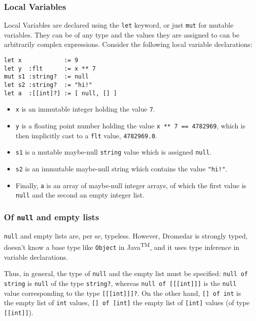\documentclass{article}
\newcommand{\code}[1]{\lstinline[columns=fixed]{#1}}
\begin{document}
			\subsubsection{Local Variables}
			
				Local Variables are declared using the \code{let} keyword, or just \code{mut} for mutable variables. They can be of any type and the values they are assigned to can be arbitrarily complex expressions. Consider the following local variable declarations:
				
				\begin{lstlisting}
let x            := 9
let y  :flt      := x ** 7
mut s1 :string?  := null
let s2 :string?  := "hi!"
let a  :[[int]?] := [ null, [] ]
				\end{lstlisting}
				
				\begin{itemize}
					\item
						\code{x} is an immutable integer holding the value \code{7}.
					\item
						\code{y} is a floating point number holding the value \code{x ** 7 == 4782969}, which is then implicitly cast to a \code{flt} value, \code{4782969.0}.
					\item
						\code{s1} is a mutable maybe-null \code{string} value which is assigned \code{null}.
					\item
						\code{s2} is an immutable maybe-null string which contains the value \code{"hi!"}.
					\item
						Finally, \code{a} is an array of maybe-null integer arrays, of which the first value is \code{null} and the second an empty integer list.
				\end{itemize}
			
			\subsubsection{Of \code{null} and empty lists}
			
				\code{null} and empty lists are, per se, typeless. However, Dromedar is strongly typed, doesn't know a base type like \texttt{Object} in Java\textsuperscript{TM}, and it uses type inference in variable declarations.
				
				Thus, in general, the type of \code{null} and the empty list must be specified: \code{null of string} is \code{null} of the type \code{string?}, whereas \code{null of [[[int]]]} is the \code{null} value corresponding to the type \code{[[[int]]]?}. On the other hand, \code{[] of int} is the empty list of \code{int} values, \code{[] of [int]} the empty list of \code{[int]} values (of type \code{[[int]]}).
				
\end{document}
